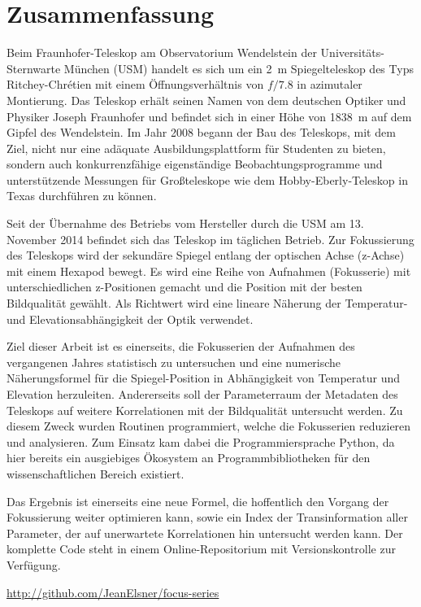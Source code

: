

\chapter*{Zusammenfassung}

Beim Fraunhofer-Teleskop am Observatorium Wendelstein der Universitäts-Sternwarte München (USM) handelt es sich um ein \SI{2}{\metre} Spiegelteleskop des Typs Ritchey-Chrétien mit einem Öffnungsverhältnis von $f/\num{7.8}$ in azimutaler Montierung. Das Teleskop erhält seinen Namen von dem deutschen Optiker und Physiker Joseph Fraunhofer und befindet sich in einer Höhe von \SI{1838}{\metre} auf dem Gipfel des Wendelstein. Im Jahr 2008 begann der Bau des Teleskops, mit dem Ziel, nicht nur eine adäquate Ausbildungsplattform für Studenten zu bieten, sondern auch konkurrenzfähige eigenständige Beobachtungsprogramme und unterstützende Messungen für Großteleskope wie dem Hobby-Eberly-Teleskop in Texas durchführen zu können\cite{aufruestung}.

Seit der Übernahme des Betriebs vom Hersteller durch die USM am 13. November 2014 befindet sich das Teleskop im täglichen Betrieb. Zur Fokussierung des Teleskops wird der sekundäre Spiegel entlang der optischen Achse (z-Achse) mit einem Hexapod bewegt. Es wird eine Reihe von Aufnahmen (Fokusserie) mit unterschiedlichen z-Positionen gemacht und die Position mit der besten Bildqualität gewählt. Als Richtwert wird eine lineare Näherung der Temperatur- und Elevationsabhängigkeit der Optik verwendet\cite{commissioning}.

Ziel dieser Arbeit ist es einerseits, die Fokusserien der Aufnahmen des vergangenen Jahres statistisch zu untersuchen und eine numerische Näherungsformel für die Spiegel-Position in Abhängigkeit von Temperatur und Elevation herzuleiten. Andererseits soll der Parameterraum der Metadaten des Teleskops auf weitere Korrelationen mit der Bildqualität untersucht werden. Zu diesem Zweck wurden Routinen programmiert, welche die Fokusserien reduzieren und analysieren. Zum Einsatz kam dabei die Programmiersprache Python, da hier bereits ein ausgiebiges Ökosystem an Programmbibliotheken für den wissenschaftlichen Bereich existiert.

Das Ergebnis ist einerseits eine neue Formel, die hoffentlich den Vorgang der Fokussierung weiter optimieren kann, sowie ein Index der Transinformation aller Parameter, der auf unerwartete Korrelationen hin untersucht werden kann. Der komplette Code steht in einem Online-Repositorium mit Versionskontrolle zur Verfügung.
\begin{mdframed}[style=emphasis]
	\centering
	\url{http://github.com/JeanElsner/focus-series}
\end{mdframed}